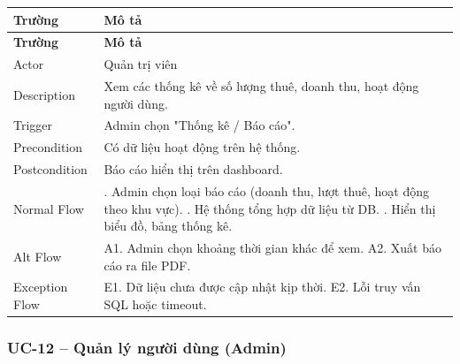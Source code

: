 \begin{longtable}{|>{\raggedright\arraybackslash}p{4cm}|>{\raggedright\arraybackslash}p{11cm}|}
\hline
\textbf{Trường} & \textbf{Mô tả} \\
\hline
\endfirsthead

\hline
\textbf{Trường} & \textbf{Mô tả} \\
\hline
\endhead

\hline
\endfoot

Actor & Quản trị viên \\
\hline
Description & Xem các thống kê về số lượng thuê, doanh thu, hoạt động người dùng. \\
\hline
Trigger & Admin chọn "Thống kê / Báo cáo". \\
\hline
Precondition & Có dữ liệu hoạt động trên hệ thống. \\
\hline
Postcondition & Báo cáo hiển thị trên dashboard. \\
\hline
Normal Flow & 1. Admin chọn loại báo cáo (doanh thu, lượt thuê, hoạt động theo khu vực). \newline 2. Hệ thống tổng hợp dữ liệu từ DB. \newline 3. Hiển thị biểu đồ, bảng thống kê. \\
\hline
Alt Flow & A1. Admin chọn khoảng thời gian khác để xem. \newline A2. Xuất báo cáo ra file PDF. \\
\hline
Exception Flow & E1. Dữ liệu chưa được cập nhật kịp thời. \newline E2. Lỗi truy vấn SQL hoặc timeout. \\
\hline
\end{longtable}

\subsubsection*{UC-12 – Quản lý người dùng (Admin)}


